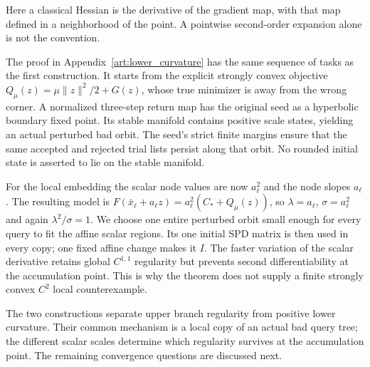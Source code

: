 Here a classical Hessian is the derivative of the gradient map, with that
map defined in a neighborhood of the point. A pointwise second-order
expansion alone is not the convention.

The proof in Appendix~\ref{art:lower_curvature} has the same sequence of
tasks as the first construction. It starts from the explicit strongly convex
objective $Q_\mu(z)=\mu\|z\|^2/2+G(z)$, whose true minimizer is away from
the wrong corner. A normalized three-step return map has the original seed
as a hyperbolic boundary fixed point. Its stable manifold contains positive
scale states, yielding an actual perturbed bad orbit. The seed's strict
finite margins ensure that the same accepted and rejected trial lists
persist along that orbit. No rounded initial state is asserted to lie on
the stable manifold.

For the local embedding the scalar node values are now $a_\ell^2$ and the
node slopes $a_\ell$. The resulting model is
$F(\bar x_\ell+a_\ell z)=a_\ell^2(C_*+Q_\mu(z))$, so
$\lambda=a_\ell$, $\sigma=a_\ell^2$ and again
$\lambda^2/\sigma=1$. We choose one entire perturbed orbit small enough
for every query to fit the affine scalar regions. Its one initial SPD
matrix is then used in every copy; one fixed affine change makes it $I$.
The faster variation of the scalar derivative retains global $C^{1,1}$
regularity but prevents second differentiability at the accumulation point.
This is why the theorem does not supply a finite strongly convex $C^2$
local counterexample.

The two constructions separate upper branch regularity from positive lower
curvature. Their common mechanism is a local copy of an actual bad query
tree; the different scalar scales determine which regularity survives at
the accumulation point. The remaining convergence questions are discussed
next.
